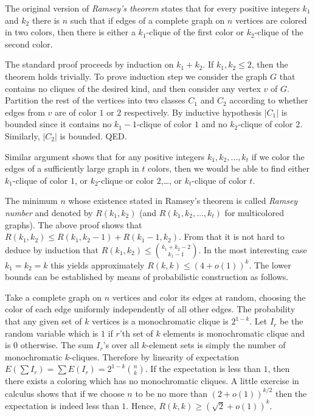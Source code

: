 \documentclass[12pt]{article}
\newcommand*{\abs}[1]{\left\lvert #1\right\rvert}
\begin{document}

The original version of \emph{Ramsey's theorem} states that for
every positive integers $k_1$ and $k_2$ there is $n$ such that if
edges of a complete graph on $n$ vertices are colored in two
colors, then there is either a $k_1$-clique of the first color or
$k_2$-clique of the second color.

The standard proof proceeds by induction on $k_1+k_2$. If
$k_1,k_2\leq 2$, then the theorem holds trivially. To prove
induction step we consider the graph $G$ that contains no cliques
of the desired kind, and then consider any vertex $v$ of $G$.
Partition the rest of the vertices into two classes $C_1$ and
$C_2$ according to whether edges from $v$ are of color $1$ or $2$
respectively. By inductive hypothesis $\abs{C_1}$ is bounded since
it contains no $k_1-1$-clique of color $1$ and no $k_2$-clique of
color $2$. Similarly, $\abs{C_2}$ is bounded. QED.

Similar argument shows that for any positive integers
$k_1,k_2,\dotsc,k_t$ if we color the edges of a sufficiently large
graph in $t$ colors, then we would be able to find either
$k_1$-clique of color $1$, or $k_2$-clique or color $2$,\dots, or
$k_t$-clique of color $t$.

The minimum $n$ whose existence stated in Ramsey's theorem is
called \emph{Ramsey number} and denoted by $R(k_1,k_2)$ (and
$R(k_1,k_2,\dotsc,k_t)$ for multicolored graphs). The above proof
shows that $R(k_1,k_2)\leq R(k_1,k_2-1)+R(k_1-1,k_2)$. From that
it is not hard to deduce by induction that $R(k_1,k_2)\leq
\binom{k_1+k_2-2}{k_1-1}$. In the most interesting case
$k_1=k_2=k$ this yields approximately $R(k,k)\leq (4+o(1))^k$. The
lower bounds can be established by means of probabilistic
construction as follows.

Take a complete graph on $n$ vertices and color its edges at random,
choosing the color of each edge uniformly independently of all other edges.
The probability that any given set of $k$ vertices is a
monochromatic clique is $2^{1-k}$. Let $I_r$ be the random
variable which is $1$ if $r$'th set of $k$ elements is
monochromatic clique and is $0$ otherwise. The sum $I_r$'s 
over all $k$-element sets is
simply the number of monochromatic $k$-cliques. Therefore by
linearity of expectation $E(\sum I_r)=\sum
E(I_r)=2^{1-k}\binom{n}{k}$. If the expectation is less than $1$,
then there exists a coloring which has no monochromatic cliques. A
little exercise in calculus shows that if we choose $n$ to be no more
than $(2+o(1))^{k/2}$ then the expectation is indeed less than
$1$. Hence, $R(k,k)\geq (\sqrt{2}+o(1))^{k}$.
\end{document}
